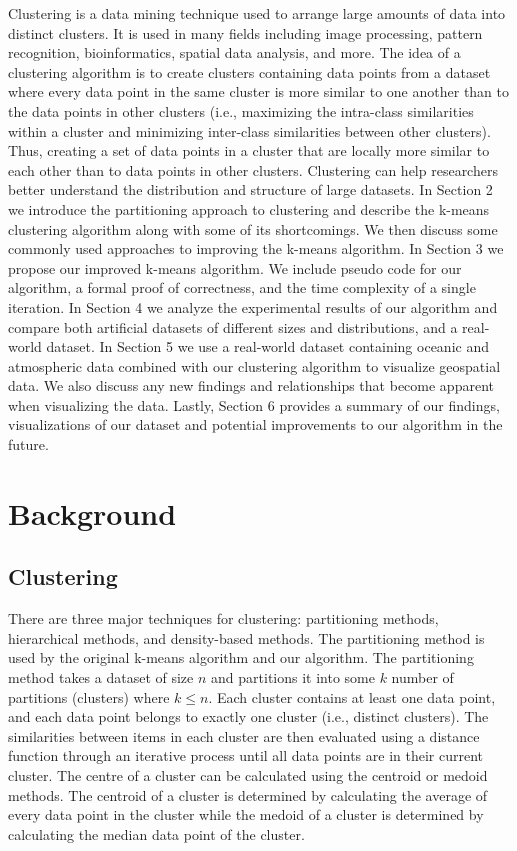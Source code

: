 \documentclass[conference,compsoc]{IEEEtran}
\begin{document}
Clustering is a data mining technique used to arrange large amounts of data into distinct clusters. It is used in many fields including image processing, pattern recognition, bioinformatics, spatial data analysis, and more. The idea of a clustering algorithm is to create clusters containing data points from a dataset where every data point in the same cluster is more similar to one another than to the data points in other clusters (i.e., maximizing the intra-class similarities within a cluster and minimizing inter-class similarities between other clusters). Thus, creating a set of data points in a cluster that are locally more similar to each other than to data points in other clusters. Clustering can help researchers better understand the distribution and structure of large datasets. In Section 2 we introduce the partitioning approach to clustering and describe the k-means clustering algorithm along with some of its shortcomings. We then discuss some commonly used approaches to improving the k-means algorithm. In Section 3 we propose our improved k-means algorithm. We include pseudo code for our algorithm, a formal proof of correctness, and the time complexity of a single iteration. In Section 4 we analyze the experimental results of our algorithm and compare both artificial datasets of different sizes and distributions, and a real-world dataset. In Section 5 we use a real-world dataset containing oceanic and atmospheric data combined with our clustering algorithm to visualize geospatial data. We also discuss any new findings and relationships that become apparent when visualizing the data. Lastly, Section 6 provides a summary of our findings, visualizations of our dataset and potential improvements to our algorithm in the future.

\section{Background}

\subsection{Clustering}

There are three major techniques for clustering: partitioning methods, hierarchical methods, and density-based methods. The partitioning method is used by the original k-means algorithm and our algorithm. The partitioning method takes a dataset of size $n$ and partitions it into some $k$ number of partitions (clusters) where $k \leq n$. Each cluster contains at least one data point, and each data point belongs to exactly one cluster (i.e., distinct clusters). The similarities between items in each cluster are then evaluated using a distance function through an iterative process until all data points are in their current cluster. The centre of a cluster can be calculated using the centroid or medoid methods. The centroid of a cluster is determined by calculating the average of every data point in the cluster while the medoid of a cluster is determined by calculating the median data point of the cluster.
\end{document}
